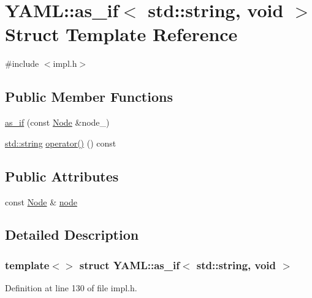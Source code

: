 \hypertarget{struct_y_a_m_l_1_1as__if_3_01std_1_1string_00_01void_01_4}{}\section{Y\+A\+ML\+::as\+\_\+if$<$ std\+::string, void $>$ Struct Template Reference}
\label{struct_y_a_m_l_1_1as__if_3_01std_1_1string_00_01void_01_4}


{\ttfamily \#include $<$impl.\+h$>$}

\subsection*{Public Member Functions}
\begin{DoxyCompactItemize}
\item 
\mbox{\hyperlink{struct_y_a_m_l_1_1as__if_3_01std_1_1string_00_01void_01_4_ae073e5c11179a1a68e6f926e08af5622}{as\+\_\+if}} (const \mbox{\hyperlink{class_y_a_m_l_1_1_node}{Node}} \&node\+\_\+)
\item 
\mbox{\hyperlink{glad_8h_ac83513893df92266f79a515488701770}{std\+::string}} \mbox{\hyperlink{struct_y_a_m_l_1_1as__if_3_01std_1_1string_00_01void_01_4_af6b5fe423b03b5397e67424240ed3770}{operator()}} () const
\end{DoxyCompactItemize}
\subsection*{Public Attributes}
\begin{DoxyCompactItemize}
\item 
const \mbox{\hyperlink{class_y_a_m_l_1_1_node}{Node}} \& \mbox{\hyperlink{struct_y_a_m_l_1_1as__if_3_01std_1_1string_00_01void_01_4_ad9fe3d3cdd241a2c363772990f50e7da}{node}}
\end{DoxyCompactItemize}


\subsection{Detailed Description}
\subsubsection*{template$<$$>$\newline
struct Y\+A\+M\+L\+::as\+\_\+if$<$ std\+::string, void $>$}



Definition at line 130 of file impl.\+h.



